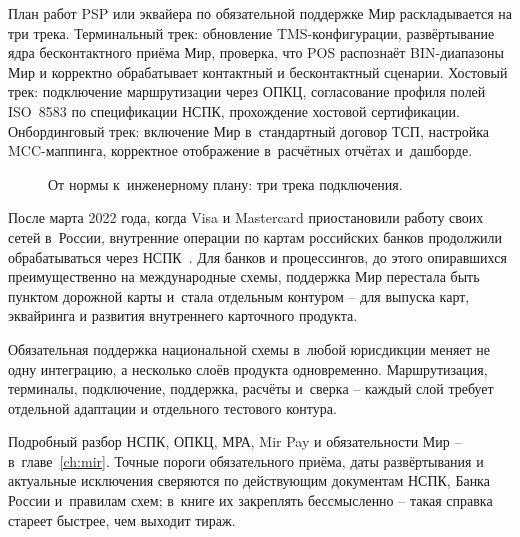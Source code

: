 План работ PSP или эквайера по обязательной поддержке Мир раскладывается на три трека.
Терминальный трек: обновление TMS-конфигурации, развёртывание ядра бесконтактного приёма Мир, проверка, что POS распознаёт BIN-диапазоны Мир и корректно обрабатывает контактный и бесконтактный сценарии.
Хостовый трек: подключение маршрутизации через ОПКЦ, согласование профиля полей ISO~8583 по спецификации НСПК, прохождение хостовой сертификации.
Онбординговый трек: включение Мир в~стандартный договор ТСП, настройка MCC-маппинга, корректное отображение в~расчётных отчётах и~дашборде.

\begin{figure}[tbp]
  \centering
  \caption{От нормы к~инженерному плану: три трека подключения.}\label{fig:regulation-to-engineering}
\end{figure}

После марта 2022 года, когда Visa и Mastercard приостановили работу своих сетей в~России, внутренние операции по картам российских банков продолжили обрабатываться через НСПК~\cite{cbr-russia-cards-normal-2022,mc-russia-suspension-2022}.
Для банков и процессингов, до этого опиравшихся преимущественно на международные схемы, поддержка Мир перестала быть пунктом дорожной карты и~стала отдельным контуром -- для выпуска карт, эквайринга и развития внутреннего карточного продукта.

Обязательная поддержка национальной схемы в~любой юрисдикции меняет не одну интеграцию, а несколько слоёв продукта одновременно. Маршрутизация, терминалы, подключение, поддержка, расчёты и~сверка -- каждый слой требует отдельной адаптации и отдельного тестового контура.

Подробный разбор НСПК, ОПКЦ, МРА, Mir Pay и обязательности Мир -- в~главе~\ref{ch:mir}. Точные пороги обязательного приёма, даты развёртывания и актуальные исключения сверяются по действующим документам НСПК, Банка России и~правилам схем; в~книге их закреплять бессмысленно -- такая справка стареет быстрее, чем выходит тираж.
